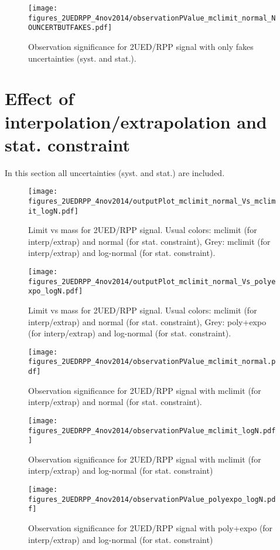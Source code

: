 \documentclass[a4paper,notitlepage]{article}
\begin{document}
\begin{figure}[!htb]
\begin{center}
\texttt{[image: figures\_2UEDRPP\_4nov2014/observationPValue\_mclimit\_normal\_NOUNCERTBUTFAKES.pdf]}
\caption{Observation significance for 2UED/RPP signal with only fakes uncertainties (syst. and stat.).}
\end{center}
\end{figure} 

\clearpage

\section{Effect of interpolation/extrapolation and stat. constraint}

In this section all uncertainties (syst. and stat.) are included.

\begin{figure}[!htb]
\begin{center}
\texttt{[image: figures\_2UEDRPP\_4nov2014/outputPlot\_mclimit\_normal\_Vs\_mclimit\_logN.pdf]}
\caption{Limit vs mass for 2UED/RPP signal. Usual colors: mclimit (for interp/extrap) and normal (for stat. constraint), Grey: mclimit (for interp/extrap) and log-normal (for stat. constraint).}
\end{center}
\end{figure} 

\begin{figure}[!htb]
\begin{center}
\texttt{[image: figures\_2UEDRPP\_4nov2014/outputPlot\_mclimit\_normal\_Vs\_polyexpo\_logN.pdf]}
\caption{Limit vs mass for 2UED/RPP signal. Usual colors: mclimit (for interp/extrap) and normal (for stat. constraint), Grey: poly+expo (for interp/extrap) and log-normal (for stat. constraint).}
\end{center}
\end{figure} 

\begin{figure}[!htb]
\begin{center}
\texttt{[image: figures\_2UEDRPP\_4nov2014/observationPValue\_mclimit\_normal.pdf]}
\caption{Observation significance for 2UED/RPP signal with mclimit (for interp/extrap) and normal (for stat. constraint).}
\end{center}
\end{figure} 

\begin{figure}[!htb]
\begin{center}
\texttt{[image: figures\_2UEDRPP\_4nov2014/observationPValue\_mclimit\_logN.pdf]}
\caption{Observation significance for 2UED/RPP signal with mclimit (for interp/extrap) and log-normal (for stat. constraint)}
\end{center}
\end{figure} 

\begin{figure}[!htb]
\begin{center}
\texttt{[image: figures\_2UEDRPP\_4nov2014/observationPValue\_polyexpo\_logN.pdf]}
\caption{Observation significance for 2UED/RPP signal with poly+expo (for interp/extrap) and log-normal (for stat. constraint)}
\end{center}
\end{figure} 
\end{document}
